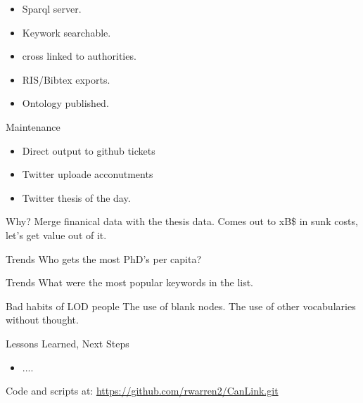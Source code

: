 \documentclass{beamer}
\begin{document}
\begin{frame}
\begin{block}{}
\begin{itemize}
\item Sparql server.
\item Keywork searchable.
\item cross linked to authorities.
\item RIS/Bibtex exports.
\item Ontology published.
\end{itemize}
\end{block}
\end{frame}

\begin{frame}
\begin{block}{Maintenance}
\begin{itemize}
\item Direct output to github tickets
\item Twitter uploade acconutments
\item Twitter thesis of the day.
\end{itemize}
\end{block}
\end{frame}





\begin{frame}
\begin{block}{Why?}
Merge finanical data with the thesis data. Comes out to xB\$ in sunk costs, let's get value out of it.
\end{block}
\end{frame}


\begin{frame}
\begin{block}{Trends}
Who gets the most PhD's per capita?
\end{block}
\end{frame}

\begin{frame}
\begin{block}{Trends}
What were the most popular keywords in the list.
\end{block}
\end{frame}

\begin{frame}
\begin{block}{Bad habits of LOD people}
The use of blank nodes.
The use of other vocabularies without thought.
\end{block}
\end{frame}



\begin{frame}
\begin{block}{Lessons Learned, Next Steps}
\begin{itemize}
\item ....
\end{itemize}
\end{block}
\begin{alertblock}{}
Code and scripts at: \url{https://github.com/rwarren2/CanLink.git}
\end{alertblock}
\end{frame}

\end{document}
